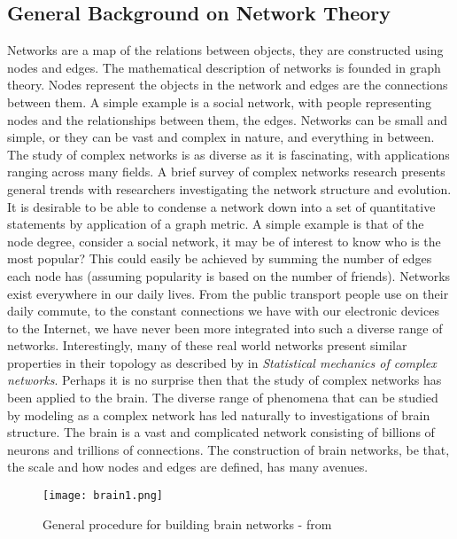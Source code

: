 \documentclass[11pt]{article}
\begin{document}
\subsection{General Background on Network Theory}
Networks are a map of the relations between objects, they are constructed using nodes and edges. The mathematical description of networks is founded in graph theory. Nodes represent the objects in the network and edges are the connections between them. A simple example is a social network, with people representing nodes and the relationships between them, the edges. Networks can be small and simple, or they can be vast and complex in nature, and everything in between. The study of complex networks is as diverse as it is fascinating, with applications ranging across many fields. A brief survey of complex networks research presents general trends with researchers investigating the network structure and evolution. It is desirable to be able to condense a network down into a set of quantitative statements by application of a graph metric. A simple example is that of the node degree, consider a social network, it may be of interest to know who is the most popular? This could easily be achieved by summing the number of edges each node has (assuming popularity is based on the number of friends). Networks exist everywhere in our daily lives. From the public transport people use on their daily commute, to the constant connections we have with our electronic devices to the Internet, we have never been more integrated into such a diverse range of networks. Interestingly, many of these real world networks present similar properties in their topology as described by \citet{albert2002statistical} in \emph{Statistical mechanics of complex networks}. Perhaps it is no surprise then that the study of complex networks has been applied to the brain. The diverse range of phenomena that can be studied by modeling as a complex network has led naturally to investigations of brain structure. The brain is a vast and complicated network consisting of billions of neurons and trillions of connections. The construction of brain networks, be that, the scale and how nodes and edges are defined, has many avenues.
\begin{figure}[h!]%
\centering\texttt{[image: brain1.png]}%
\caption{General procedure for building brain networks -  from \citep{fall}}
\label{b1}
\end{figure}
\end{document}
